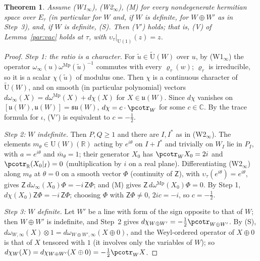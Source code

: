 \documentclass[10pt]{amsart}
\newtheorem{theorem}{Theorem}[section]
\theoremstyle{definition}
\theoremstyle{remark}
\newcommand{\C}{\mathbb C}
\newcommand{\R}{\mathbb R}
\providecommand{\auU}{\mathrm U}
\begin{document}
\begin{theorem}\label{pco:V}
Assume \textup{(W1$_\infty$)}, \textup{(W2$_\infty$)}, \textup{(M)} for every nondegenerate hermitian
space over $E_\tau$ (in particular for $W$ and, if $W$ is definite, for $W\oplus W'$ as in Step~3),
and, if $W$ is definite, \textup{(S)}. Then \textup{(V$'$)} holds; that is, \textup{(V)} of Lemma~\ref{par:vac} holds at
$\tau$, with $\upsilon_\tau|_{\auU(1)}(z)=z$.
\end{theorem}
\begin{proof}
\emph{Step 1: the ratio is a character.} For $\tilde u\in\widetilde{\auU}(W)$ over $u$, by
(W1$_\infty$) the operator $\omega_\infty(u)\omega^{\mathrm{Mp}}(\tilde u)^{-1}$ commutes with every
$\varrho_\tau(w)$; $\varrho_\tau$ is irreducible, so it is a scalar $\chi(\tilde u)$ of modulus one.
Then $\chi$ is a continuous character of $\widetilde{\auU}(W)$, and on smooth (in particular
polynomial) vectors $d\omega_\infty(X)=d\omega^{\mathrm{Mp}}(X)+d\chi(X)$ for $X\in\mathfrak u(W)$.
Since $d\chi$ vanishes on $[\mathfrak u(W),\mathfrak u(W)]=\mathfrak{su}(W)$, $d\chi=c\cdot\pcotr_W$
for some $c\in\C$. By the trace formula for $\iota$, (V$'$) is equivalent to $c=-\frac12$.

\emph{Step 2: $W$ indefinite.} Then $P,Q\ge1$ and there are $I,I^*$ as in (W2$_\infty$). The
elements $m_\theta\in\auU(W)(\R)$ acting by $e^{i\theta}$ on $I+I^*$ and trivially on $W_I$ lie in
$P_I$, with $a=e^{i\theta}$ and $\bar m_\theta=1$; their generator $X_0$ has $\pcotr_WX_0=2i$ and
$\pcotr_\R(X_0|_I)=0$ (multiplication by $i$ on a real plane). Differentiating
(W2$_\infty$) along $m_\theta$ at $\theta=0$ on a smooth vector $\Phi$ (continuity of $\mathsf Z$),
with $\upsilon_\tau(e^{i\theta})=e^{i\theta}$, gives $\mathsf Z\,d\omega_\infty(X_0)\Phi=-i\,\mathsf Z\Phi$;
and (M) gives $\mathsf Z\,d\omega^{\mathrm{Mp}}(X_0)\Phi=0$. By Step 1, $d\chi(X_0)\mathsf Z\Phi=-i
\,\mathsf Z\Phi$; choosing $\Phi$ with $\mathsf Z\Phi\ne0$, $2ic=-i$, so $c=-\frac12$.

\emph{Step 3: $W$ definite.} Let $W'$ be a line with form of the sign opposite to that of $W$; then
$W\oplus W'$ is indefinite, and Step~2 gives $d\chi_{W\oplus W'}=-\frac12\pcotr_{W\oplus W'}$. By
(S), $d\omega_{W,\infty}(X)\otimes1=d\omega_{W\oplus W',\infty}(X\oplus0)$, and the Weyl-ordered
operator of $X\oplus0$ is that of $X$ tensored with $1$ (it involves only the variables of $W$); so
$d\chi_W(X)=d\chi_{W\oplus W'}(X\oplus0)=-\frac12\pcotr_WX$.
\end{proof}
\end{document}
